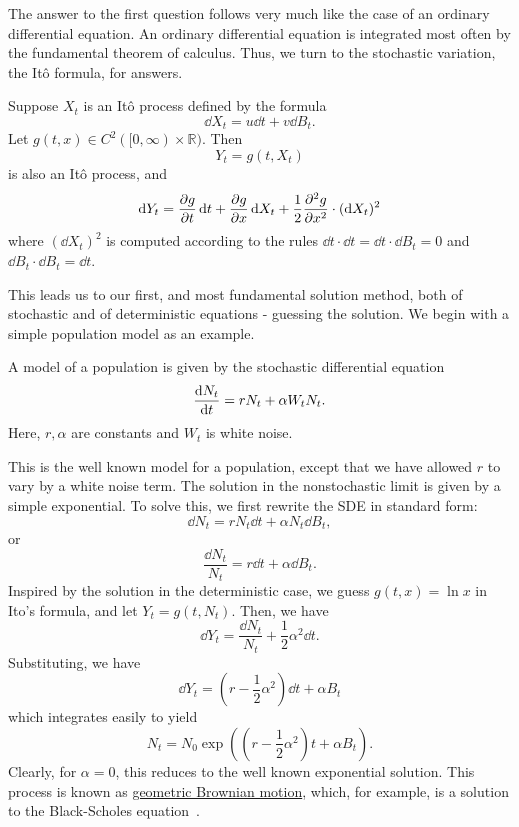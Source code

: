 \documentclass[prb,12pt]{revtex4-2}
\theoremstyle{definition}
\theoremstyle{definition}
\theoremstyle{definition}
\newcommand{\R}{\mathbb{R}}
\begin{document}
The answer to the first question follows very much like the case of an ordinary differential equation. An ordinary differential equation is integrated most often by the fundamental theorem of calculus. Thus, we turn to the stochastic variation, the Itô formula, for answers.
\begin{Theorem}
	Suppose $X_t$ is an Itô process defined by the formula
	\[\dd{X_t}=u\dd{t}+v\dd{B_t}.\]
	Let $g(t,x)\in C^2([0,\infty)\times \R)$. Then
	\[Y_t=g(t, X_t)\]
	is also an Itô process, and
	\[\dd{Y_t}=\pdv{g}{t}(t, X_t)\dd{t}+\pdv{g}{x}(t, X_t)\dd{X_t}+\frac 12 \pdv[2]{g}{x}(t, X_t)\cdot (\dd{X_t})^2\]
	where $(\dd{X_t})^2$ is computed according to the rules $\dd{t}\cdot \dd{t} = \dd{t}\cdot \dd{B_t}=0$ and $\dd{B_t}\cdot \dd{B_t}=\dd{t}$.
\end{Theorem}
This leads us to our first, and most fundamental solution method, both of stochastic and of deterministic equations - guessing the solution. We begin with a simple population model as an example.
\begin{Example}
	A model of a population is given by the stochastic differential equation
	\[\dv{N_t}{t} = r N_t + \alpha W_t N_t.\]
	Here, $r,\alpha$ are constants and $W_t$ is white noise.
\end{Example}
This is the well known model for a population, except that we have allowed $r$ to vary by a white noise term. The solution in the nonstochastic limit is given by a simple exponential. To solve this, we first rewrite the SDE in standard form:
\[\dd{N_t}=r N_t\dd{t}+\alpha N_t \dd{B_t},\]
or
\[\frac{\dd{N_t}}{N_t} = r \dd{t} + \alpha \dd{B_t}.\]
Inspired by the solution in the deterministic case, we guess $g(t, x)=\ln x$ in Ito's formula, and let $Y_t=g(t, N_t)$. Then, we have
\[\dd{Y_t}=\frac{\dd{N_t}}{N_t}+\frac 12 \alpha^2 \dd{t}.\]
Substituting, we have
\[\dd{Y_t} = \left(r- \frac 12\alpha^2 \right)\dd{t} +\alpha B_t\]
which integrates easily to yield
\[N_t = N_0 \exp\left(\left(r - \frac 12 \alpha^2\right)t+\alpha B_t\right).\]
Clearly, for $\alpha=0$, this reduces to the well known exponential solution. This process is known as \uline{geometric Brownian motion}, which, for example, is a solution to the Black-Scholes equation~\cite{inbook}.
\end{document}
